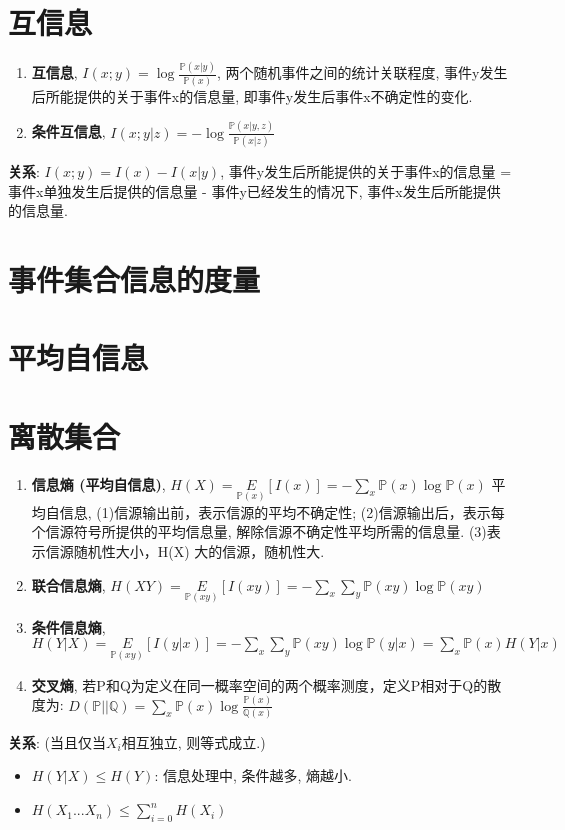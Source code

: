 \documentclass{article}
\newcommand{\env}[2]{\begin{#1}#2\end{#1}}
\newcommand{\defi}[2]{\textbf{#1}, #2}
\newcommand{\P}{\mathbb P}
\begin{document}
        \section{互信息}
            \env{enumerate}{
                \item \defi{互信息}{$I(x;y) = \log\frac{\P(x|y)}{\P(x)}$, 两个随机事件之间的统计关联程度, 事件y发生后所能提供的关于事件x的信息量, 即事件y发生后事件x不确定性的变化.}
                \item \defi{条件互信息}{$I(x;y|z) = -\log\frac{\P(x|y, z)}{\P(x|z)}$}
            }
            \textbf{关系}: $I(x;y) = I(x) - I(x|y)$, 事件y发生后所能提供的关于事件x的信息量 = 事件x单独发生后提供的信息量 - 事件y已经发生的情况下, 事件x发生后所能提供的信息量.
   
    \section{事件集合信息的度量}
        \section{平均自信息}
            \section{离散集合}
                \env{enumerate}{
                    \item \defi{信息熵 (平均自信息)}{$H(X) = \underset{\P(x)}{E}[I(x)] = -\sum\limits_x \P(x)\log \P(x)$ 平均自信息, (1)信源输出前，表示信源的平均不确定性; (2)信源输出后，表示每个信源符号所提供的平均信息量, 解除信源不确定性平均所需的信息量. (3)表示信源随机性大小，H(X) 大的信源，随机性大. }
                    \item \defi{联合信息熵}{$H(XY) = \underset{\P(xy)}{E}[I(xy)] = -\sum\limits_x \sum\limits_y \P(xy) \log \P(xy)$}
                    \item \defi{条件信息熵}{$H(Y|X) = \underset{\P(xy)}{E}[I(y|x)] = -\sum\limits_x \sum\limits_y \P(xy) \log \P(y|x) = \sum\limits_x \P(x) H(Y|x)$}
                    \item \defi{交叉熵}{若P和Q为定义在同一概率空间的两个概率测度，定义P相对于Q的散度为: $D(\P || \mathbb Q)=\sum\limits_x \P(x) \log \frac{\P(x)}{\mathbb Q(x)}$}
                }
                
                \textbf{关系}: (当且仅当$X_i$相互独立, 则等式成立.)
                    \env{itemize}{
                    \item $H(Y|X) \le H(Y)$: 信息处理中, 条件越多, 熵越小.
                    \item $H(X_1...X_n) \le \sum\limits_{i=0}^n H(X_i)$
                    }
                
\end{document}
